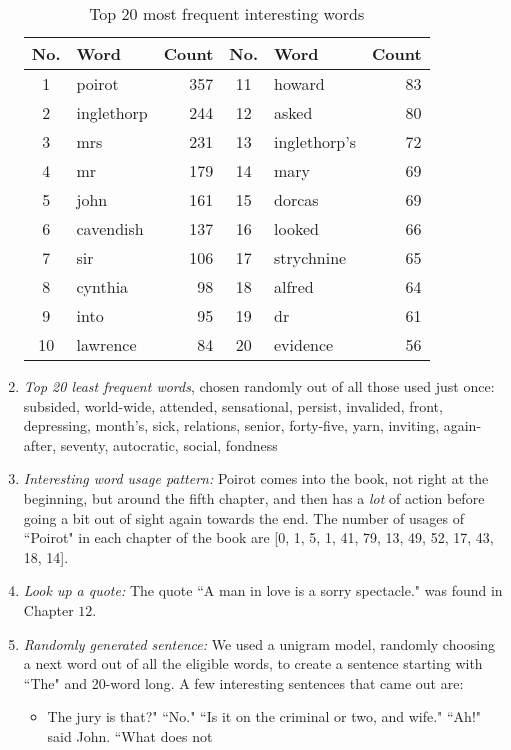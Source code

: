 \documentclass[12pt]{article}
\begin{document}
\begin{enumerate}
\begin{table}[H]
\begin{tabular}{c|l|r||c|l|r}
            \toprule
            No. & Word & Count & No. & Word & Count \\
            \midrule
            1 & poirot & 357 & 11 & howard & 83 \\
            2 & inglethorp & 244 & 12 & asked & 80 \\
            3 & mrs & 231 & 13 & inglethorp's & 72 \\
            4 & mr & 179 & 14 & mary & 69 \\
            5 & john & 161 & 15 & dorcas & 69 \\
            6 & cavendish & 137 & 16 & looked & 66 \\
            7 & sir & 106 & 17 & strychnine & 65 \\
            8 & cynthia & 98 & 18 & alfred & 64 \\
            9 & into & 95 & 19 & dr & 61 \\
            10 & lawrence & 84 & 20 & evidence & 56 \\
            \bottomrule
          \end{tabular}
          \caption{Top 20 most frequent interesting words}
          \label{top20int}
        \end{table}
  \item \textit{Top 20 least frequent words}, chosen randomly out of all those used just once: \\ subsided, world-wide, attended, sensational, persist, invalided, front, depressing, month's, sick, relations, senior, forty-five, yarn, inviting, again-after, seventy, autocratic, social, fondness
  \item \textit{Interesting word usage pattern:} Poirot comes into the book, not right at the beginning, but around the fifth chapter, and then has a \textit{lot} of action before going a bit out of sight again towards the end. The number of usages of ``Poirot" in each chapter of the book are [0, 1, 5, 1, 41, 79, 13, 49, 52, 17, 43, 18, 14].
  \item \textit{Look up a quote:} The quote ``A man in love is a sorry spectacle." was found in Chapter $12$.
  \item \textit{Randomly generated sentence:} We used a unigram model, randomly choosing a next word out of all the eligible words, to create a sentence starting with ``The" and 20-word long. A few interesting sentences that came out are:
            \begin{itemize}
              \item The jury is that?" ``No." ``Is it on the criminal or two, and wife." ``Ah!" said John. ``What does not

\end{itemize}
\end{enumerate}
\end{document}
